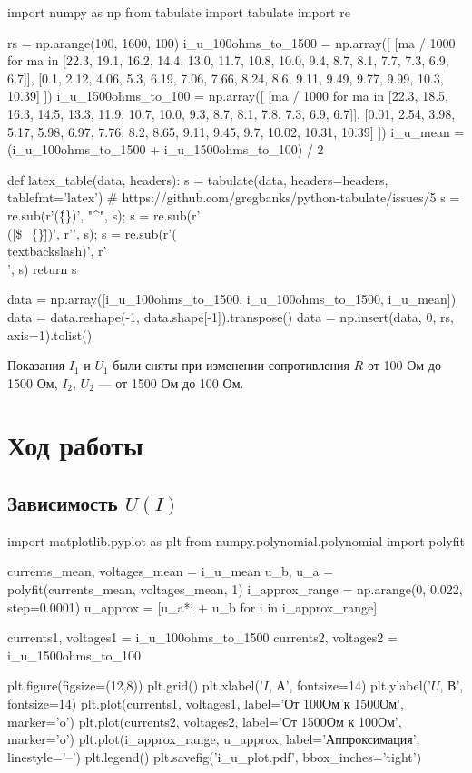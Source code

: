 \documentclass[12pt, a4paper]{article}
\begin{document}
\begin{pycode}
import numpy as np
from tabulate import tabulate
import re

rs = np.arange(100, 1600, 100)
i_u_100ohms_to_1500 = np.array([
  [ma / 1000 for ma in [22.3, 19.1, 16.2, 14.4, 13.0, 11.7, 10.8, 10.0, 9.4, 8.7, 8.1, 7.7, 7.3, 6.9, 6.7]],
  [0.1, 2.12, 4.06, 5.3, 6.19, 7.06, 7.66, 8.24, 8.6, 9.11, 9.49, 9.77, 9.99, 10.3, 10.39]
])
i_u_1500ohms_to_100 = np.array([
  [ma / 1000 for ma in [22.3, 18.5, 16.3, 14.5, 13.3, 11.9, 10.7, 10.0, 9.3, 8.7, 8.1, 7.8, 7.3, 6.9, 6.7]],
  [0.01, 2.54, 3.98, 5.17, 5.98, 6.97, 7.76, 8.2, 8.65, 9.11, 9.45, 9.7, 10.02, 10.31, 10.39]
])
i_u_mean = (i_u_100ohms_to_1500 + i_u_1500ohms_to_100) / 2

def latex_table(data, headers):
  s = tabulate(data, headers=headers, tablefmt='latex')
  # https://github.com/gregbanks/python-tabulate/issues/5
  s = re.sub(r'(\^\{\})', "^", s); s = re.sub(r'\\([\$\_\{\}\^])', r'\1', s); s = re.sub(r'(\\textbackslash{})', r'\\', s)
  return s

data = np.array([i_u_100ohms_to_1500, i_u_100ohms_to_1500, i_u_mean])
data = data.reshape(-1, data.shape[-1]).transpose()
data = np.insert(data, 0, rs, axis=1).tolist()
\end{pycode}

\begin{table}[H]
\end{table} 

Показания $I_1$ и $U_1$ были сняты при изменении сопротивления $R$ от 100 Ом
до 1500 Ом, $I_2$, $U_2$ — от 1500 Ом до 100 Ом.

\section*{Ход работы}

\subsection*{Зависимость $U(I)$}

\begin{pycode}
import matplotlib.pyplot as plt
from numpy.polynomial.polynomial import polyfit

currents_mean, voltages_mean = i_u_mean
u_b, u_a = polyfit(currents_mean, voltages_mean, 1)
i_approx_range = np.arange(0, 0.022, step=0.0001)
u_approx = [u_a*i + u_b for i in i_approx_range]

currents1, voltages1 = i_u_100ohms_to_1500
currents2, voltages2 = i_u_1500ohms_to_100

plt.figure(figsize=(12,8))
plt.grid()
plt.xlabel('$I$, А', fontsize=14)
plt.ylabel('$U$, В', fontsize=14)
plt.plot(currents1, voltages1, label='От 100Ом к 1500Ом', marker='o')
plt.plot(currents2, voltages2, label='От 1500Ом к 100Ом', marker='o')
plt.plot(i_approx_range, u_approx, label='Аппроксимация', linestyle='--')
plt.legend()
plt.savefig('i_u_plot.pdf', bbox_inches='tight')
\end{pycode}
\end{document}
